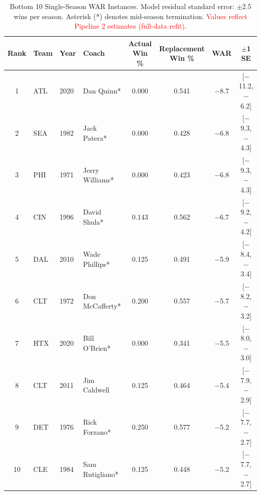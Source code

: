 \documentclass[USenglish]{article}
\newcommand{\rev}[1]{\textcolor{red}{#1}}
\theoremstyle{dgthm}
\theoremstyle{dgdef}
\begin{document}
\begin{table}[!ht]
\caption{Bottom 10 Single-Season WAR Instances. Model residual standard error: $\pm$2.5 wins per season. Asterisk (*) denotes mid-season termination. \rev{Values reflect Pipeline 2 estimates (full-data refit).}}
\label{tab:bottom_single_season}
\small
\begin{tabular}{clllcccc}
\toprule
Rank & Team & Year & Coach & Actual Win \% & Replacement Win \% & WAR & $\pm$1 SE \\
\midrule
1 & ATL & 2020 & Dan Quinn* & 0.000 & 0.541 & $-$8.7 & [$-$11.2, $-$6.2] \\
2 & SEA & 1982 & Jack Patera* & 0.000 & 0.428 & $-$6.8 & [$-$9.3, $-$4.3] \\
3 & PHI & 1971 & Jerry Williams* & 0.000 & 0.423 & $-$6.8 & [$-$9.3, $-$4.3] \\
4 & CIN & 1996 & David Shula* & 0.143 & 0.562 & $-$6.7 & [$-$9.2, $-$4.2] \\
5 & DAL & 2010 & Wade Phillips* & 0.125 & 0.491 & $-$5.9 & [$-$8.4, $-$3.4] \\
6 & CLT & 1972 & Don McCafferty* & 0.200 & 0.557 & $-$5.7 & [$-$8.2, $-$3.2] \\
7 & HTX & 2020 & Bill O'Brien* & 0.000 & 0.341 & $-$5.5 & [$-$8.0, $-$3.0] \\
8 & CLT & 2011 & Jim Caldwell & 0.125 & 0.464 & $-$5.4 & [$-$7.9, $-$2.9] \\
9 & DET & 1976 & Rick Forzano* & 0.250 & 0.577 & $-$5.2 & [$-$7.7, $-$2.7] \\
10 & CLE & 1984 & Sam Rutigliano* & 0.125 & 0.448 & $-$5.2 & [$-$7.7, $-$2.7] \\
\bottomrule
\end{tabular}
\end{table}
\end{document}
